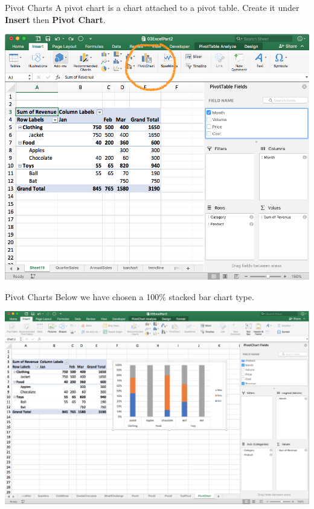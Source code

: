 \documentclass[xcolor=svgnames, handout]{beamer}
\begin{document}
\begin{frame}{Pivot Charts}
A pivot chart is a chart attached to a pivot table.  Create it under {\bf Insert} then {\bf Pivot Chart}.
\begin{center}
\includegraphics[width=.9\textwidth]{pivChart.png}
\end{center}
\end{frame}


\begin{frame}{Pivot Charts}
Below we have chosen a 100\% stacked bar chart type.
\begin{center}
\includegraphics[width=.9\textwidth]{pivChart2.png}
\end{center}
\end{frame}
\end{document}
